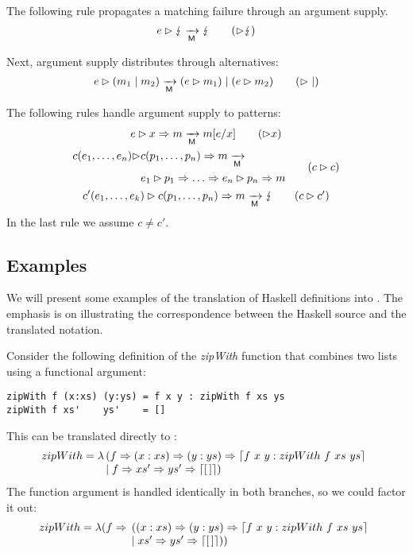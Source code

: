The following rule propagates a matching failure through an argument supply.
\begin{equation}
  \matcharg{e}{\matchfail} \matred \matchfail \tag{$\amatcharg\matchfail$}
\end{equation}

Next, argument supply distributes through alternatives:
\begin{equation}
  \matcharg{e}{(\matchalt{m_1}{m_2})} \matred
  \matchalt{(\matcharg{e}{m_1})}{(\matcharg{e}{m_2})} \tag{$\amatcharg\amatchalt$}
\end{equation}

The following rules handle argument supply to patterns:
\begin{gather}
  \matcharg{e}{\matchpat{x}{m}} \matred m[e/x] \tag{$\amatcharg x$}\\
  \begin{split}
      \matcharg{\constr{c}{e_1,\ldots,e_n}}{&\matchpat{\constr{c}{p_1,\ldots,p_n}}{m}}
      \matred \\
      &e_1 \amatcharg p_1 \amatchpat \ldots \amatchpat e_n \amatcharg p_n \amatchpat m
    \end{split} \tag{$c\amatcharg c$}
  \\
  \matcharg{\constr{c'}{e_1,\ldots,e_k}}{\matchpat{\constr{c}{p_1,\ldots,p_n}}{m}}
  \matred
  \matchfail \tag{$c\amatcharg c'$} 
\end{gather}
In the last rule we assume $c\neq c'$.


\subsection{Examples}\label{sec:examples}
%
We will present some examples of the translation of Haskell
definitions into \lambdaPMC.  The emphasis is on illustrating the
correspondence between the Haskell source and the translated notation.

Consider the following definition of the \emph{zipWith} function that
combines two lists using a functional argument:
%
\begin{verbatim}
zipWith f (x:xs) (y:ys) = f x y : zipWith f xs ys
zipWith f xs'    ys'    = []
\end{verbatim}
%
This can be translated directly to \lambdaPMC:
%
\[
  zipWith = \lambda 
  \!\!\begin{array}[t]{l}
    (f \Rightarrow (x:xs) \Rightarrow (y:ys) \Rightarrow \left\lceil f~x~y : zipWith~ f~ xs~ ys\right\rceil  \\
    \mid f \Rightarrow xs' \Rightarrow ys' \Rightarrow \left\lceil [\,]\right\rceil)
  \end{array}
\]
%
The function argument is handled identically in both branches, so we
could factor it out:
 \[
   zipWith = \lambda (f \Rightarrow 
   \!\!\begin{array}[t]{l}
     ((x:xs) \Rightarrow (y:ys) \Rightarrow \left\lceil f~ x~ y : zipWith~f~xs~ys\right\rceil  \\
     \mid  xs' \Rightarrow ys' \Rightarrow \left\lceil [\,]\right\rceil))
   \end{array}
 \]

